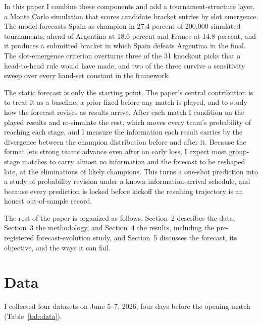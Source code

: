 \documentclass[11pt,letterpaper]{article}
\begin{document}
In this paper I combine these components and add a tournament-structure layer, a Monte Carlo simulation that scores candidate bracket entries by slot emergence. The model forecasts Spain as champion in 27.4 percent of 200{,}000 simulated tournaments, ahead of Argentina at 18.6 percent and France at 14.8 percent, and it produces a submitted bracket in which Spain defeats Argentina in the final. The slot-emergence criterion overturns three of the 31 knockout picks that a head-to-head rule would have made, and two of the three survive a sensitivity sweep over every hand-set constant in the framework.

The static forecast is only the starting point. The paper's central contribution is to treat it as a baseline, a prior fixed before any match is played, and to study how the forecast revises as results arrive. After each match I condition on the played results and re-simulate the rest, which moves every team's probability of reaching each stage, and I measure the information each result carries by the divergence between the champion distribution before and after it. Because the format lets strong teams advance even after an early loss, I expect most group-stage matches to carry almost no information and the forecast to be reshaped late, at the eliminations of likely champions. This turns a one-shot prediction into a study of probability revision under a known information-arrival schedule, and because every prediction is locked before kickoff the resulting trajectory is an honest out-of-sample record.

The rest of the paper is organized as follows. Section~2 describes the data, Section~3 the methodology, and Section~4 the results, including the pre-registered forecast-evolution study, and Section~5 discusses the forecast, its objective, and the ways it can fail.

\section{Data}

I collected four datasets on June 5--7, 2026, four days before the opening match (Table~\ref{tab:data}).
\end{document}
